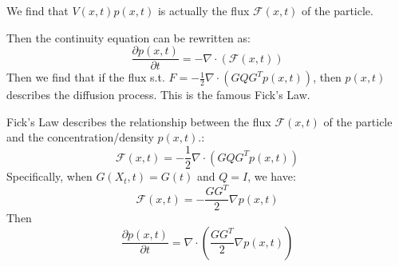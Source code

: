 \begin{definition}[Flux]
    We find that $V(x, t)p(x, t)$ is actually the flux $\mathcal{F}(x, t)$ of the particle.
\end{definition}
Then the continuity equation can be rewritten as:
\begin{equation}
    \frac{\partial p(x, t)}{\partial t} = -\nabla\cdot\left(\mathcal{F}(x, t)\right)
\end{equation}
Then we find that if the flux s.t. $F = -\frac{1}{2}\nabla\cdot\left(GQG^Tp(x, t)\right)$, then $p(x, t)$ describes the diffusion process. This is the famous Fick's Law.
\begin{theorem}
    Fick's Law describes the relationship between the flux $\mathcal{F}(x, t)$ of the particle and the concentration/density $p(x, t)$.:
    \begin{equation}
        \mathcal{F}(x, t) = -\frac{1}{2}\nabla\cdot\left(GQG^Tp(x, t)\right)
    \end{equation}
    Specifically, when $G(X_t, t)=G(t)$ and $Q=I$, we have:
    \begin{equation}
        \mathcal{F}(x, t) = -\frac{GG^T}{2}\nabla p(x, t)
    \end{equation}
    Then 
    \begin{equation}
        \frac{\partial p(x, t)}{\partial t} = \nabla \cdot\left(\frac{GG^T}{2}\nabla p(x, t)\right)
    \end{equation}
\end{theorem}
